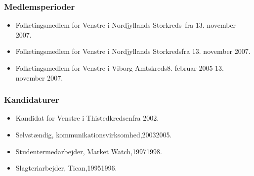 \documentclass[11pt, a4paper]{awesome-cv}
\begin{document}
\begin{cvletter}
\subsubsection*{Medlemsperioder}
\begin{itemize}
\item Folketingsmedlem for Venstre i Nordjyllands Storkreds fra 13. november 2007.
\item Folketingsmedlem for Venstre i Nordjyllands Storkredsfra 13. november 2007.
\item Folketingsmedlem for Venstre i Viborg Amtskreds8. februar 2005  13. november 2007.
\end{itemize}
\subsubsection*{Kandidaturer}
\begin{itemize}
\item Kandidat for Venstre i Thistedkredsenfra 2002.
\end{itemize}
\begin{itemize}
\item Selvstændig, kommunikationsvirksomhed,20032005.
\item Studentermedarbejder, Market Watch,19971998.
\item Slagteriarbejder, Tican,19951996.
\end{itemize}
\end{cvletter}
\end{document}
